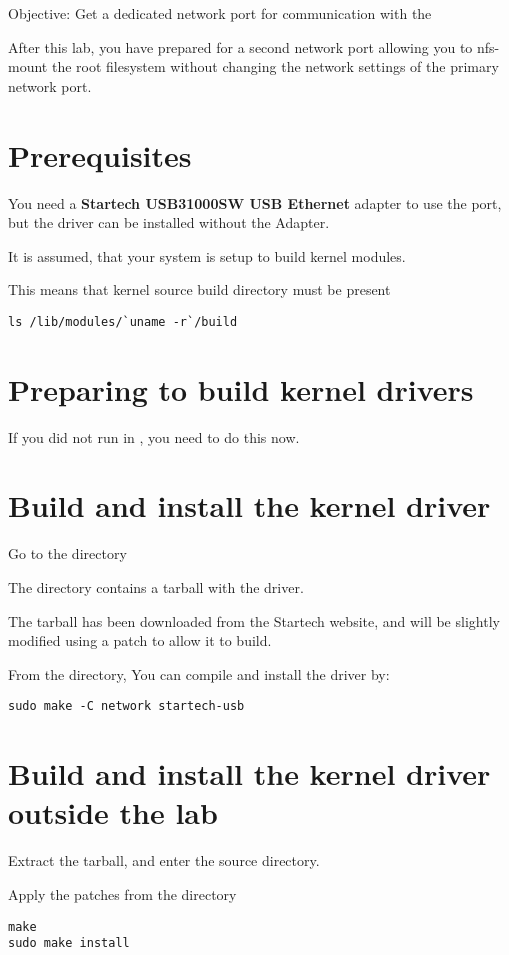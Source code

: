{Objective: Get a dedicated network port for communication with the \devboard}

After this lab, you have prepared for a second network port allowing you to nfs-mount the \devboard
root filesystem without changing the network settings of the primary network port.

\section{Prerequisites}

You need a {\bf Startech USB31000SW USB Ethernet} adapter to use the port, but the driver
can be installed without the Adapter.

It is assumed, that your system is setup to build kernel modules.

This means that kernel source build directory must be present

\begin{verbatim}
ls /lib/modules/`uname -r`/build
\end{verbatim}

\section{Preparing to build kernel drivers}

If you did not run  in \labdir, you need to do this now.

\section{Build and install the kernel driver}

Go to the \labdir directory 

The  directory contains a tarball with the driver.

The tarball has been downloaded from the Startech website, and will be slightly
modified using a patch to allow it to build.

From the \labdir directory, You can compile and install the driver by:

\begin{verbatim}
sudo make -C network startech-usb
\end{verbatim}

\section{Build and install the kernel driver outside the lab}

Extract the tarball, and enter the source directory.

Apply the patches from the  directory

\begin{verbatim}
make
sudo make install
\end{verbatim}




